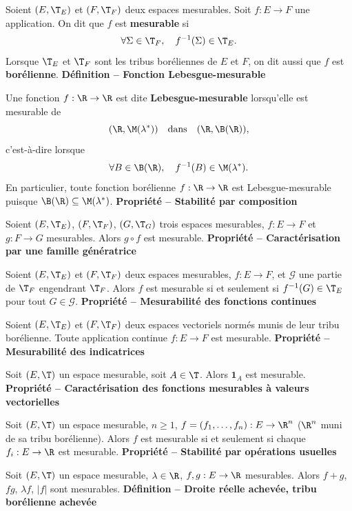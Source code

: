 Soient $(E,\T_E)$ et $(F,\T_F)$ deux espaces mesurables. Soit $f:E\to F$ une application. On dit que $f$ est \textbf{mesurable} si
\[\forall\Sigma\in\T_F,\quad f^{-1}(\Sigma)\in\T_E.\]
Lorsque $\T_E$ et $\T_F$ sont les tribus boréliennes de $E$ et $F$, on dit aussi que $f$ est \textbf{borélienne}.
\textbf{Définition – Fonction Lebesgue-mesurable}

Une fonction $f:\R\to\R$ est dite \textbf{Lebesgue-mesurable} lorsqu’elle est mesurable de
\[(\R,\M(\lambda^*))\quad\text{dans}\quad(\R,\B(\R)),\]
c’est-à-dire lorsque
\[\forall B\in\B(\R),\quad f^{-1}(B)\in\M(\lambda^*).\]
En particulier, toute fonction borélienne $f:\R\to\R$ est Lebesgue-mesurable puisque $\B(\R)\subseteq\M(\lambda^*)$.
\textbf{Propriété – Stabilité par composition}

Soient $(E,\T_E)$, $(F,\T_F)$, $(G,\T_G)$ trois espaces mesurables, $f:E\to F$ et $g:F\to G$ mesurables. Alors $g\circ f$ est mesurable.
\textbf{Propriété – Caractérisation par une famille génératrice}

Soient $(E,\T_E)$ et $(F,\T_F)$ deux espaces mesurables, $f:E\to F$, et $\mathcal G$ une partie de $\T_F$ engendrant $\T_F$. Alors $f$ est mesurable si et seulement si $f^{-1}(G)\in\T_E$ pour tout $G\in\mathcal G$.
\textbf{Propriété – Mesurabilité des fonctions continues}

Soient $(E,\T_E)$ et $(F,\T_F)$ deux espaces vectoriels normés munis de leur tribu borélienne. Toute application continue $f:E\to F$ est mesurable.
\textbf{Propriété – Mesurabilité des indicatrices}

Soit $(E,\T)$ un espace mesurable, soit $A\in\T$. Alors $\mathbf1_A$ est mesurable.
\textbf{Propriété – Caractérisation des fonctions mesurables à valeurs vectorielles}

Soit $(E,\T)$ un espace mesurable, $n\ge1$, $f=(f_1,\ldots,f_n):E\to\R^n$ ($\R^n$ muni de sa tribu borélienne). Alors $f$ est mesurable si et seulement si chaque $f_i:E\to\R$ est mesurable.
\textbf{Propriété – Stabilité par opérations usuelles}

Soit $(E,\T)$ un espace mesurable, $\lambda\in\R$, $f,g:E\to\R$ mesurables. Alors $f+g$, $fg$, $\lambda f$, $|f|$ sont mesurables.
\textbf{Définition – Droite réelle achevée, tribu borélienne achevée}

